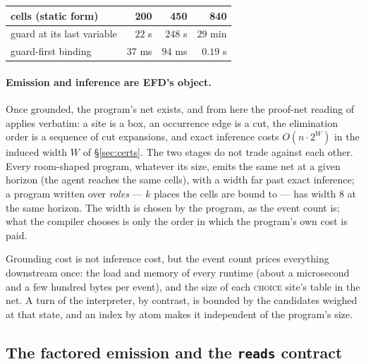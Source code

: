 \documentclass[11pt]{article}
\theoremstyle{plain}
\theoremstyle{definition}
\theoremstyle{remark}
\begin{document}
\begin{center}\small
\begin{tabular}{lrrr}
\toprule
cells (static form) & 200 & 450 & 840 \\
\midrule
guard at its last variable & $22$ s & $248$ s & $29$ min \\
guard-first binding & $37$ ms & $94$ ms & $0.19$ s \\
\bottomrule
\end{tabular}
\end{center}

\paragraph{Emission and inference are EFD's object.} Once grounded,
the program's net exists, and from here the proof-net reading of
\cite{EFD26} applies verbatim: a site is a box, an occurrence edge is a
cut, the elimination order is a sequence of cut expansions, and exact
inference costs $O(n \cdot 2^{W})$ in the induced width $W$ of
\S\ref{sec:certs}. The two stages do not trade against each other.
Every room-shaped program, whatever its size, emits the same net at a
given horizon (the agent reaches the same cells), with a width far past
exact inference; a program written over \emph{roles} --- $k$ places the
cells are bound to --- has width $8$ at the same horizon. The width is
chosen by the program, as the event count is; what the compiler
chooses is only the order in which the program's own cost is paid.

Grounding cost is not inference cost, but the event count prices
everything downstream once: the load and memory of every runtime (about
a microsecond and a few hundred bytes per event), and the size of each
\textsc{choice} site's table in the net. A turn of the interpreter, by
contrast, is bounded by the candidates weighed at that state, and an
index by atom makes it independent of the program's size.

\subsection{The factored emission and the \texttt{reads} contract}
\label{sec:emission}
\end{document}
